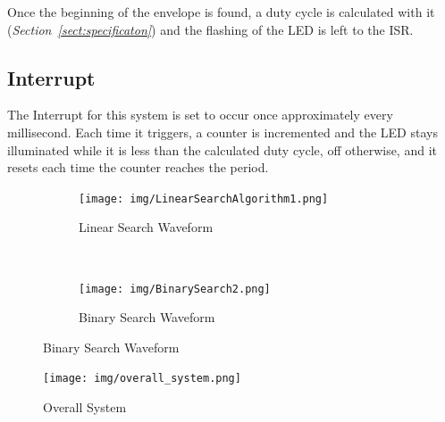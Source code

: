 \documentclass[a4paper]{article}
\begin{document}
Once the beginning of the envelope is found, a duty cycle is calculated with it (\textit{Section~\ref{sect:specificaton}}) and the flashing of the LED is left to the ISR.

\subsection{Interrupt}
The Interrupt for this system is set to occur once approximately every millisecond. Each time it triggers, a counter is incremented and the LED stays illuminated while it is less than the calculated duty cycle, off otherwise, and it resets each time the counter reaches the period.


\newpage
\begin{figure}[t]
    \centering
    \begin{subfigure}[b]{0.5\textwidth}
        \texttt{[image: img/LinearSearchAlgorithm1.png]}
        \caption{Linear Search Waveform}
        \label{fig_linearsearch}
    \end{subfigure}~
    \begin{subfigure}[b]{0.5\textwidth}
        \texttt{[image: img/BinarySearch2.png]}
        \caption{Binary Search Waveform}
        \label{fig:binary_search}
\end{subfigure}

\end{figure}


\begin{figure}[t!]
    \centering
    \texttt{[image: img/overall\_system.png]}
    \caption{Overall System}
    \label{fig_summaryimage}
\end{figure}


\end{document}
